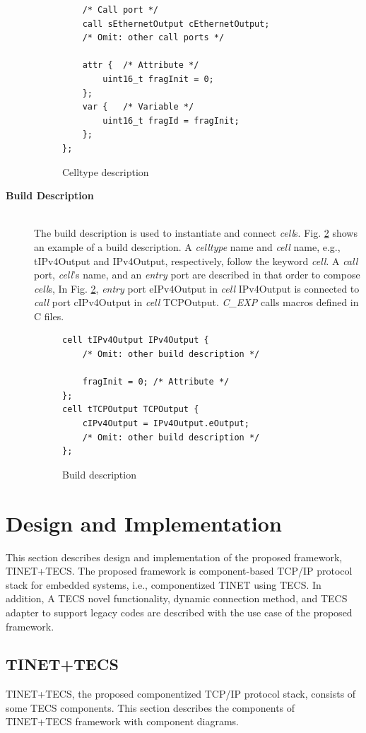 \documentclass[conference]{IEEEtran/IEEEtran}
\begin{document}
\begin{description}
\begin{figure}[t]
\begin{lstlisting}
    /* Call port */
    call sEthernetOutput cEthernetOutput;
    /* Omit: other call ports */

    attr {  /* Attribute */
        uint16_t fragInit = 0;
    };
    var {   /* Variable */
        uint16_t fragId = fragInit;
    };
};
\end{lstlisting}
\caption{Celltype description}
\label{src:celltype}
\end{figure}
    \item[{\bf Build Description}]\mbox{}\\
        The build description is used to instantiate and connect {\it cell}s.
        Fig. \ref{src:build} shows an example of a build description.
        A {\it celltype} name and {\it cell} name, e.g., tIPv4Output and IPv4Output, respectively, follow the keyword {\it cell}.
        A {\it call} port, {\it cell}'s name, and an {\it entry} port are described in that order to compose {\it cell}s,
        In Fig. \ref{src:build}, {\it entry} port eIPv4Output in {\it cell} IPv4Output is connected to {\it call} port cIPv4Output in {\it cell} TCPOutput.
        {\it C\_EXP} calls macros defined in C files.

\begin{figure}[t]
\centering
\begin{lstlisting}
cell tIPv4Output IPv4Output {
    /* Omit: other build description */
    
    fragInit = 0; /* Attribute */
};
cell tTCPOutput TCPOutput {
    cIPv4Output = IPv4Output.eOutput;
    /* Omit: other build description */
};
\end{lstlisting}
\caption{Build description}
\label{src:build}
\end{figure}

\end{description}

\section{Design and Implementation}
\label{sec:Design and Implementation}

This section describes design and implementation of the proposed framework, TINET+TECS.
The proposed framework is component-based TCP/IP protocol stack for embedded systems, i.e., componentized TINET using TECS.
In addition, A TECS novel functionality, dynamic connection method, and TECS adapter to support legacy codes are described with the use case of the proposed framework.

\subsection{TINET+TECS}
TINET+TECS, the proposed componentized TCP/IP protocol stack, consists of some TECS components.
This section describes the components of TINET+TECS framework with component diagrams.
\end{document}
